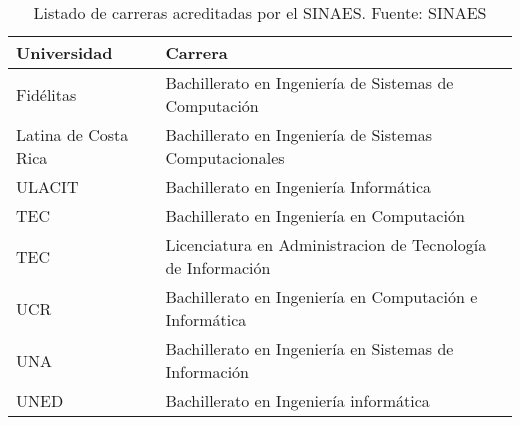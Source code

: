 \begin{table}[h!]
    \footnotesize
    \begin{tabular}{ll}
        \toprule[1.5pt]
        \textbf{Universidad} & \textbf{Carrera}\\
        \midrule
        Fidélitas & Bachillerato en Ingeniería de Sistemas de Computación \\
        Latina de Costa Rica & Bachillerato en Ingeniería de Sistemas Computacionales \\
        ULACIT & Bachillerato en Ingeniería Informática \\
        TEC & Bachillerato en Ingeniería en Computación \\
        TEC & Licenciatura en Administracion de Tecnología de Información \\
        UCR & Bachillerato en Ingeniería en Computación e Informática \\
        UNA & Bachillerato en Ingeniería en Sistemas de Información \\
        UNED & Bachillerato en Ingeniería informática \\
        \bottomrule[1.5pt]  
    \end{tabular}
    \caption{Listado de carreras acreditadas por el SINAES. Fuente: SINAES \cite{sinaes}}
    \label{table:listado-sinaes}
\end{table}
 
